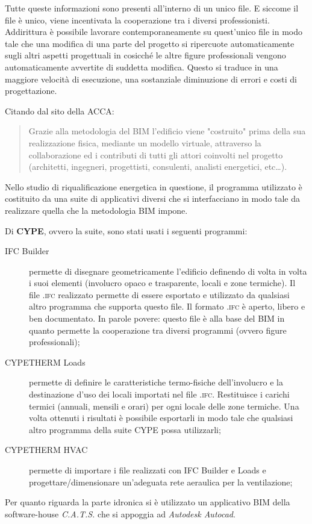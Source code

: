 Tutte queste informazioni sono presenti all'interno di un unico file. E siccome il file è unico, viene incentivata la cooperazione tra i diversi professionisti. Addirittura è possibile lavorare contemporaneamente su quest'unico file in modo tale che una modifica di una parte del progetto si ripercuote automaticamente sugli altri aspetti progettuali in cosicché le altre figure professionali vengono automaticamente avvertite di suddetta modifica. Questo si traduce in una maggiore velocità di esecuzione, una sostanziale diminuzione di errori e costi di progettazione.

Citando dal sito della ACCA:
\begin{quote}
	Grazie alla metodologia del BIM l'edificio viene "costruito" prima della sua realizzazione fisica, mediante un modello virtuale, attraverso la collaborazione ed i contributi di tutti gli attori coinvolti nel progetto (architetti, ingegneri, progettisti, consulenti, analisti energetici, etc\dots).
\end{quote}
Nello studio di riqualificazione energetica in questione, il programma utilizzato è costituito da una suite di applicativi diversi che si interfacciano in modo tale da realizzare quella che la metodologia BIM impone.

Di \textbf{CYPE}, ovvero la suite, sono stati usati i seguenti programmi:
\begin{description}
	\item[IFC Builder]permette di disegnare geometricamente l'edificio definendo di volta in volta i suoi elementi (involucro opaco e trasparente, locali e zone termiche). Il file \textsc{.ifc} realizzato permette di essere esportato e utilizzato da qualsiasi altro programma che supporta questo file. Il formato \textsc{.ifc} è aperto, libero e ben documentato. In parole povere: questo file è alla base del BIM in quanto permette la cooperazione tra diversi programmi (ovvero figure professionali);
	\item[CYPETHERM Loads]permette di definire le caratteristiche termo-fisiche dell'involucro e la destinazione d'uso dei locali importati nel file \textsc{.ifc}. Restituisce i carichi termici (annuali, mensili e orari) per ogni locale delle zone termiche. Una volta ottenuti i risultati è possibile esportarli in modo tale che qualsiasi altro programma della suite CYPE possa utilizzarli;
	\item[CYPETHERM HVAC]permette di importare i file realizzati con IFC Builder e Loads e progettare/dimensionare un'adeguata rete aeraulica per la ventilazione;
\end{description}
Per quanto riguarda la parte idronica si è utilizzato un applicativo BIM della software-house \emph{C.A.T.S.} che si appoggia ad \emph{Autodesk Autocad}.


